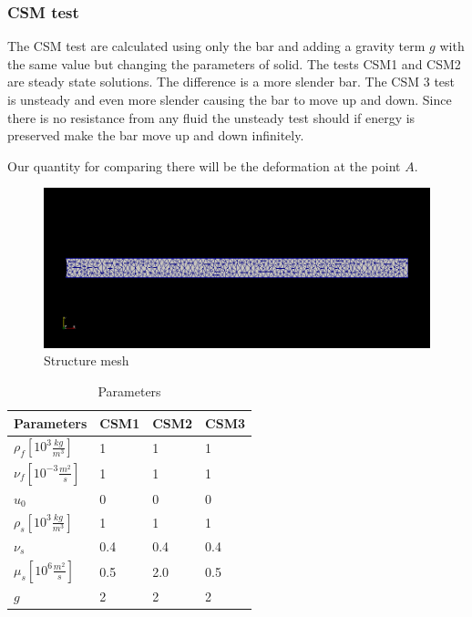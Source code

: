 \subsubsection{CSM test}
The CSM test are calculated using only the bar and adding a gravity term $g$ with the same value but changing the parameters of solid. The tests CSM1 and CSM2 are steady state solutions. The difference is a more slender bar. The CSM 3 test is unsteady and even more slender causing the bar to move up and down. Since there is no resistance from any fluid the unsteady test should if energy is preserved make the bar move up and down infinitely. 

Our quantity for comparing there will be the deformation at the point $A$. 
\begin{center}
\begin{figure}[H]
\caption{Structure mesh}
\includegraphics[scale=0.50,trim={18mm 55mm 18mm 55mm},clip]{./Verification_Validation/Hron_Turek/structure.png}
\end{figure}
\end{center}

\vspace{0cm}

\begin{table}[H]
\centering
\caption{Parameters}
\label{my-label}
\begin{tabular}{|l|l|l|l|}
\hline
Parameters & CSM1 & CSM2 & CSM3 \\ \hline
$\rho_f[10^3 \frac{kg}{m^3}]$ & 1 & 1 & 1 \\ \hline
$\nu_f [10^{-3} \frac{m^2}{s}]$ & 1 & 1 & 1 \\ \hline
$u_0$ & 0 & 0 & 0 \\ \hline
$\rho_s[10^3 \frac{kg}{m^3}]$ & 1 & 1 & 1 \\ \hline
$\nu_s$ & 0.4 & 0.4 & 0.4 \\ \hline
$\mu_s[10^6 \frac{m^2}{s}]$ & 0.5 & 2.0 & 0.5 \\ \hline
$g $ & 2 & 2 & 2 \\ \hline
\end{tabular}
\end{table}


